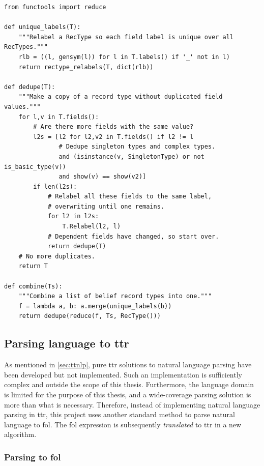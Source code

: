 \begin{lstlisting}[label={lst:combine}, caption=The \texttt{combine} and \texttt{dedupe} functions.]
from functools import reduce

def unique_labels(T):
    """Relabel a RecType so each field label is unique over all RecTypes."""
    rlb = ((l, gensym(l)) for l in T.labels() if '_' not in l)
    return rectype_relabels(T, dict(rlb))

def dedupe(T):
    """Make a copy of a record type without duplicated field values."""
    for l,v in T.fields():
        # Are there more fields with the same value?
        l2s = [l2 for l2,v2 in T.fields() if l2 != l
               # Dedupe singleton types and complex types.
               and (isinstance(v, SingletonType) or not is_basic_type(v))
               and show(v) == show(v2)]
        if len(l2s):
            # Relabel all these fields to the same label,
			# overwriting until one remains.
            for l2 in l2s:
                T.Relabel(l2, l)
            # Dependent fields have changed, so start over.
            return dedupe(T)
    # No more duplicates.
    return T

def combine(Ts):
    """Combine a list of belief record types into one."""
    f = lambda a, b: a.merge(unique_labels(b))
    return dedupe(reduce(f, Ts, RecType()))
\end{lstlisting}



\subsection{Parsing language to \gls{ttr}}
\label{sec:parsing}

As mentioned in \autoref{sec:ttnlp}, pure \gls{ttr} solutions to natural language parsing have been developed but not implemented.
Such an implementation is sufficiently complex and outside the scope of this thesis.
Furthermore, the language domain is limited for the purpose of this thesis, and a wide-coverage parsing solution is more than what is necessary.
Therefore, instead of implementing natural language parsing in \gls{ttr}, this project uses
another standard method to parse natural language to \gls{fol}.
The \gls{fol} expression is subsequently \textit{translated} to \gls{ttr} in a new algorithm.

\subsubsection{Parsing to \gls{fol}}

